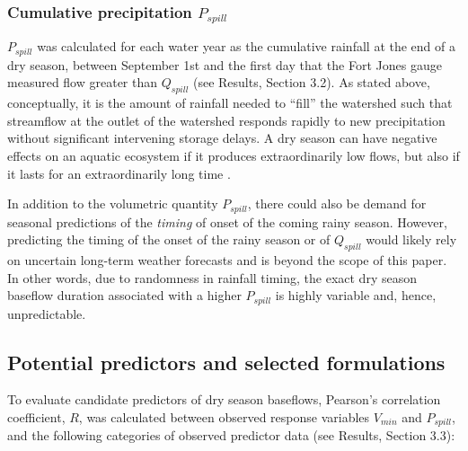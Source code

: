 \documentclass[hess, manuscript]{copernicus}
\begin{document}
\subsubsection{\texorpdfstring{Cumulative precipitation
$P_{spill}$}{Cumulative precipitation P\_\{spill\}}}

$P_{spill}$ was calculated for each water year as the cumulative
rainfall at the end of a dry season, between September 1st and the first
day that the Fort Jones gauge measured flow greater than $Q_{spill}$
(see Results, Section 3.2). As stated above, conceptually, it is the
amount of rainfall needed to ``fill'' the watershed such that streamflow
at the outlet of the watershed responds rapidly to new precipitation
without significant intervening storage delays. A dry season can have
negative effects on an aquatic ecosystem if it produces extraordinarily
low flows, but also if it lasts for an extraordinarily long time
\citep[e.g., delayed salmon habitat access,][]{CDFW2015a}.

In addition to the volumetric quantity $P_{spill}$, there could also
be demand for seasonal predictions of the \emph{timing} of onset of the
coming rainy season. However, predicting the timing of the onset of the
rainy season or of $Q_{spill}$ would likely rely on uncertain
long-term weather forecasts and is beyond the scope of this paper. In
other words, due to randomness in rainfall timing, the exact dry season
baseflow duration associated with a higher $P_{spill}$ is highly
variable and, hence, unpredictable.

\subsection{Potential predictors and selected formulations}

To evaluate candidate predictors of dry season baseflows, Pearson's
correlation coefficient, $R$, was calculated between observed response
variables $V_{min}$ and $P_{spill}$, and the following categories of
observed predictor data (see Results, Section 3.3):
\end{document}
